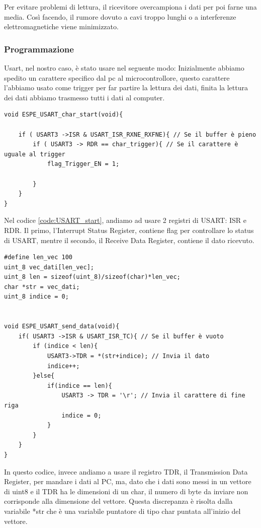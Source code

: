 Per evitare problemi di lettura, il ricevitore overcampiona i dati per poi farne una media. Così facendo, il rumore dovuto a cavi troppo lunghi o a interferenze elettromagnetiche viene minimizzato.\\


\subsubsection{Programmazione}
Usart, nel nostro caso, è stato usare nel seguente modo: Inizialmente abbiamo spedito un carattere specifico dal pc al microcontrollore, questo carattere l'abbiamo usato come trigger per far partire la lettura dei dati, finita la lettura dei dati abbiamo trasmesso tutti i dati al computer.\\

\noindent
\begin{verbatim}
void ESPE_USART_char_start(void){

    if ( USART3 ->ISR & USART_ISR_RXNE_RXFNE){ // Se il buffer è pieno
        if ( USART3 -> RDR == char_trigger){ // Se il carattere è uguale al trigger
            flag_Trigger_EN = 1;

        }
    }
}
\end{verbatim}
\label{code:USART_start}

Nel codice \ref{code:USART_start}, andiamo ad usare 2 registri di USART: ISR e RDR. Il primo, l'Interrupt Status Register, contiene flag per controllare lo status di USART, mentre il secondo, il Receive Data Register, contiene il dato ricevuto.\\

\noindent
\begin{verbatim}
#define len_vec 100
uint_8 vec_dati[len_vec];
uint_8 len = sizeof(uint_8)/sizeof(char)*len_vec;
char *str = vec_dati;
uint_8 indice = 0;


void ESPE_USART_send_data(void){
    if( USART3 ->ISR & USART_ISR_TC){ // Se il buffer è vuoto
		if (indice < len){
			USART3->TDR = *(str+indice); // Invia il dato
			indice++;
		}else{
			if(indice == len){
				USART3 -> TDR = '\r'; // Invia il carattere di fine riga
				indice = 0;
			}
		}
	}
}
\end{verbatim}
\label{code:USART_send}

In questo codice, invece andiamo a usare il registro TDR, il Transmission Data Register, per mandare i dati al PC, ma, dato che i dati sono messi in un vettore di uint8 e il TDR ha le dimensioni di un char, il numero di byte da inviare non corrisponde alla dimensione del vettore. Questa discrepanza è risolta dalla variabile *str che è una variabile puntatore di tipo char puntata all'inizio del vettore.\\


